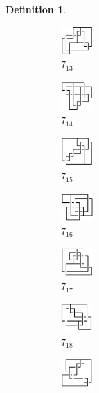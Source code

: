 \documentclass{article}
\theoremstyle{definition}
\newtheorem{defn}[thm]{Definition}
\theoremstyle{theorem}
\theoremstyle{proposition}
\theoremstyle{corollary}
\begin{document}
\begin{defn}
\begin{figure}[H]
\begin{subfigure}{0.075\textwidth}
    \includegraphics[width=1.25cm]{../Midterm_Poster/grid_diagram/theta_7_13.png}
    \caption{$7_{13}$} 
    \end{subfigure}
    \begin{subfigure}{0.075\textwidth}
    \includegraphics[width=1.25cm]{../Midterm_Poster/grid_diagram/theta_7_14.png}
    \caption{$7_{14}$} 
    \end{subfigure}
    \begin{subfigure}{0.075\textwidth}
    \includegraphics[width=1.25cm]{../Midterm_Poster/grid_diagram/theta_7_15.png}
    \caption{$7_{15}$} 
    \end{subfigure}
    \begin{subfigure}{0.075\textwidth}
    \includegraphics[width=1.25cm]{../Midterm_Poster/grid_diagram/theta_7_16.png}
    \caption{$7_{16}$} 
    \end{subfigure}
    \begin{subfigure}{0.075\textwidth}
    \includegraphics[width=1.25cm]{../Midterm_Poster/grid_diagram/theta_7_17.png}
    \caption{$7_{17}$} 
    \end{subfigure}
    \begin{subfigure}{0.075\textwidth}
    \includegraphics[width=1.25cm]{../Midterm_Poster/grid_diagram/theta_7_18.png}
    \caption{$7_{18}$} 
    \end{subfigure}
    \begin{subfigure}{0.075\textwidth}
    \includegraphics[width=1.25cm]{../Midterm_Poster/grid_diagram/theta_7_19.png}

\end{subfigure}
\end{figure}
\end{defn}
\end{document}
